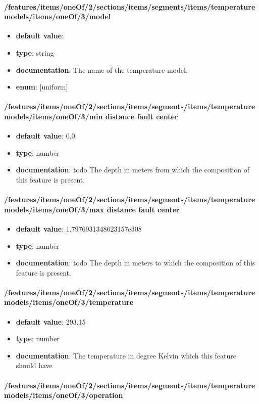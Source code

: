 \paragraph{/features/items/oneOf/2/sections/items/segments/items/temperature models/items/oneOf/3/model}
\begin{itemize}\item {\bf default value}: 
\item {\bf type}: string
\item {\bf documentation}: The name of the temperature model.
\item {\bf enum}: [uniform]\end{itemize}\paragraph{/features/items/oneOf/2/sections/items/segments/items/temperature models/items/oneOf/3/min distance fault center}
\begin{itemize}\item {\bf default value}: 0.0
\item {\bf type}: number
\item {\bf documentation}: todo The depth in meters from which the composition of this feature is present.
\end{itemize}\paragraph{/features/items/oneOf/2/sections/items/segments/items/temperature models/items/oneOf/3/max distance fault center}
\begin{itemize}\item {\bf default value}: 1.7976931348623157e308
\item {\bf type}: number
\item {\bf documentation}: todo The depth in meters to which the composition of this feature is present.
\end{itemize}\paragraph{/features/items/oneOf/2/sections/items/segments/items/temperature models/items/oneOf/3/temperature}
\begin{itemize}\item {\bf default value}: 293.15
\item {\bf type}: number
\item {\bf documentation}: The temperature in degree Kelvin which this feature should have
\end{itemize}\paragraph{/features/items/oneOf/2/sections/items/segments/items/temperature models/items/oneOf/3/operation}
